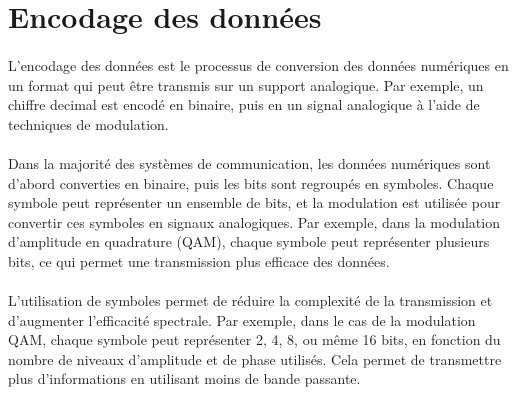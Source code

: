 \documentclass[a4paper,twocolumn]{report}
\begin{document}
\section{Encodage des données}

\paragraph{}L'encodage des données est le processus de conversion des données numériques en un format qui peut être transmis sur un support analogique. Par exemple, un chiffre decimal est encodé en binaire, puis en un signal analogique à l'aide de techniques de modulation.
\paragraph{}Dans la majorité des systèmes de communication, les données numériques sont d'abord converties en binaire, puis les bits sont regroupés en symboles. Chaque symbole peut représenter un ensemble de bits, et la modulation est utilisée pour convertir ces symboles en signaux analogiques. Par exemple, dans la modulation d'amplitude en quadrature (QAM), chaque symbole peut représenter plusieurs bits, ce qui permet une transmission plus efficace des données.
\paragraph{}L'utilisation de symboles permet de réduire la complexité de la transmission et d'augmenter l'efficacité spectrale. Par exemple, dans le cas de la modulation QAM, chaque symbole peut représenter 2, 4, 8, ou même 16 bits, en fonction du nombre de niveaux d'amplitude et de phase utilisés. Cela permet de transmettre plus d'informations en utilisant moins de bande passante.
\end{document}
